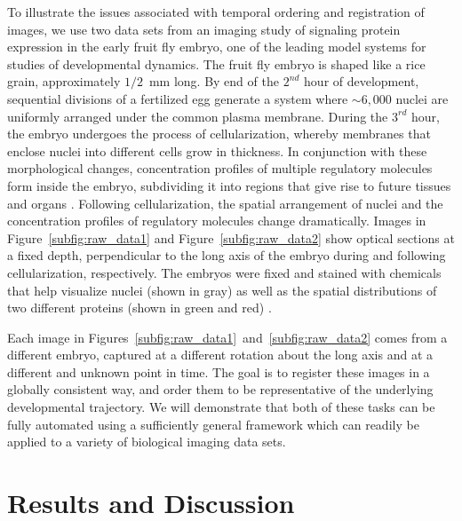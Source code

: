 \documentclass{pnastwo}
\begin{document}
\begin{article}
To illustrate the issues associated with temporal ordering and registration of images, we use two data sets from an imaging study of signaling protein expression in the early fruit fly embryo, one of the leading model systems for studies of developmental dynamics.
%
The fruit fly embryo is shaped like a rice grain, approximately $1/2$~mm long.
%
By end of the $2^{nd}$ hour of development, sequential divisions of a fertilized egg generate a system where $\sim 6,000$ nuclei are uniformly arranged under the common plasma membrane.
%
During the $3^{rd}$ hour, the embryo undergoes the process of cellularization, whereby membranes that enclose nuclei into different cells grow in thickness.
%
In conjunction with these morphological changes, concentration profiles of multiple regulatory molecules form inside the embryo, subdividing it into regions that give rise to future tissues and organs \cite{lim2013kinetics}.
%
Following cellularization, the spatial arrangement of nuclei and the concentration profiles of regulatory molecules change dramatically.
%
Images in Figure~\ref{subfig:raw_data1} and Figure~\ref{subfig:raw_data2} show optical sections at a fixed depth, perpendicular to the long axis of the embryo during and following cellularization, respectively.
%
The embryos were fixed and stained with chemicals that help visualize nuclei (shown in gray) as well as the spatial distributions of two different proteins (shown in green and red) \cite{chung2010microfluidic}.
%

Each image in Figures~\ref{subfig:raw_data1}~and~\ref{subfig:raw_data2} comes from a different embryo, captured at a different rotation about the long axis and at a different and unknown point in time.
%
The goal is to register these images in a globally consistent way, and order them to be representative of the underlying developmental trajectory.
%
We will demonstrate that both of these tasks can be fully automated using a sufficiently general framework which can readily be applied to a variety of biological imaging data sets. 



\section{Results and Discussion}


\end{article}
\end{document}
